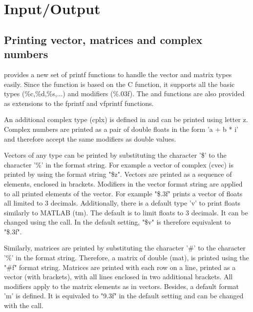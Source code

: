\chapter{Input/Output}
\label{cha:io}


\section{Printing vector, matrices and complex numbers}

      \libit provides a new set of printf functions to handle the
      vector and matrix types easily. Since the  function is
      based on the C  function, it supports all the basic types
      (\%c,\%d,\%s,...) and modifiers (\%.03f). The
       and  functions are
      also provided as extensions to the fprintf and vfprintf
      functions.

      An additional complex type (cplx) is defined in \libit and can be printed
      using letter z. Complex numbers are printed as a pair of double floats in the 
      form 'a + b * i' and therefore accept the same modifiers as double values.

      Vectors of any type can be printed by substituting the character
      '\$' to the character '\%' in the format string. For example a
      vector of complex (cvec) is printed by using the format string
      "\$z". Vectors are printed as a sequence of elements, enclosed
      in brackets. Modifiers in the vector format string are applied
      to all printed elements of the vector. For example "\$.3f"
      prints a vector of floats all limited to 3 decimals.
      Additionally, there is a default type 'v' to print floats
      similarly to MATLAB (tm). The default is to limit floats to 3
      decimals. It can be changed using the
       call. In the default
      setting, "\$v" is therefore equivalent to "\$.3f".

      Similarly, matrices are printed by substituting the character '\#' to the
      character '\%' in the format string. Therefore, a matrix of double (mat),
      is printed using the "\#f" format string. Matrices are printed with each
      row on a line, printed as a vector (with brackets), with all lines
      enclosed in two additional brackets. All modifiers apply to the matrix
      elements as in vectors. Besides, a default format 'm' is defined.
      It is equivaled to "9.3f" in the default setting and can be changed with
      the  call.

